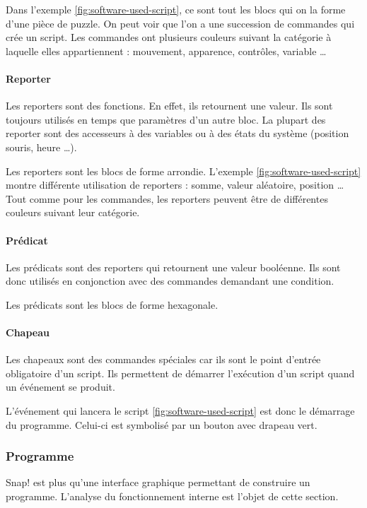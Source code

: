 Dans l'exemple \ref{fig:software-used-script}, ce sont tout les blocs qui on la forme d'une pièce de puzzle. On peut voir que l'on a une succession de commandes qui crée un script. Les commandes ont plusieurs couleurs suivant la catégorie à laquelle elles appartiennent : mouvement, apparence, contrôles, variable \ldots

\paragraph{Reporter}
Les reporters sont des fonctions. En effet, ils retournent une valeur. Ils sont toujours utilisés en temps que paramètres d'un autre bloc. La plupart des reporter sont des accesseurs à des variables ou à des états du système (position souris, heure \ldots). 

Les reporters sont les blocs de forme arrondie. L'exemple \ref{fig:software-used-script} montre différente utilisation de reporters : somme, valeur aléatoire, position \ldots Tout comme pour les commandes, les reporters peuvent être de différentes couleurs suivant leur catégorie.

\paragraph{Prédicat}
Les prédicats sont des reporters qui retournent une valeur booléenne. Ils sont donc utilisés en conjonction avec des commandes demandant une condition.

Les prédicats sont les blocs de forme hexagonale.

\paragraph{Chapeau}
Les chapeaux sont des commandes spéciales car ils sont le point d'entrée obligatoire d'un script. Ils permettent de démarrer l'exécution d'un script quand un événement se produit.

L'événement qui lancera le script \ref{fig:software-used-script} est donc le démarrage du programme. Celui-ci est symbolisé par un bouton avec drapeau vert.

\subsubsection{Programme}
Snap! est plus qu'une interface graphique permettant de construire un programme. L'analyse du fonctionnement interne est l'objet de cette section.

